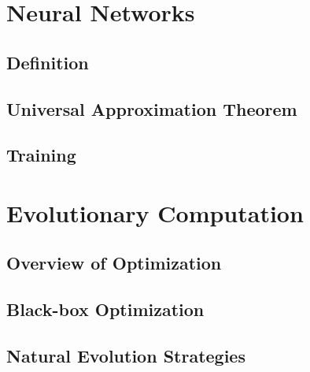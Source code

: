 \section{Neural Networks}
\subsection{Definition}
\subsection{Universal Approximation Theorem}
\subsection{Training}

\section{Evolutionary Computation}
\subsection{Overview of Optimization}
\subsection{Black-box Optimization}
\subsection{Natural Evolution Strategies}